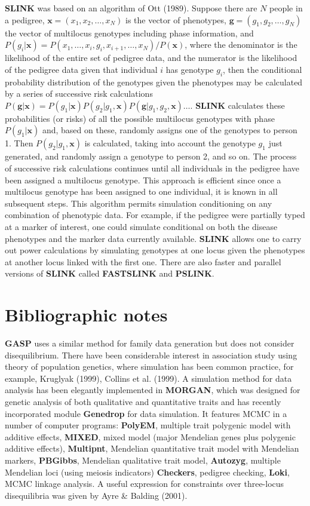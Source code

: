 {\bf SLINK} was based on an algorithm of Ott (1989).  Suppose there are $N$
people in a pedigree, $\mathbf{x} = (x_1, x_2,\ldots,x_N)$ is the vector of
phenotypes, $\mathbf{g} = (g_1, g_2,\ldots, g_N)$ the vector of multilocus
genotypes including phase information, and $P(g_i|\mathbf{x}) = {P(x_1, \ldots,
x_i, g_i, x_{i+1}, \ldots, x_N)}/{P(\mathbf{x})}$, where the denominator is the
likelihood of the entire set of pedigree data, and the numerator is the
likelihood of the pedigree data given that individual $i$ has genotype $g_i$,
then the conditional probability distribution of the genotypes given the
phenotypes may be calculated by a series of successive risk calculations
$P(\mathbf{g}|\mathbf{x}) = P(g_1|\mathbf{x}) P(g_2|g_1,\mathbf{x})
P(\mathbf{g}|g_1, g_2, \mathbf{x})\ldots$.  {\bf SLINK} calculates these
probabilities (or risks) of all the possible multilocus genotypes with phase
$P(g_1|\mathbf{x})$ and, based on these, randomly assigns one of the genotypes
to person 1.  Then $P(g_2|g_1, \mathbf{x})$ is calculated, taking into account
the genotype $g_1$ just generated, and randomly assign a genotype to person 2,
and so on.  The process of successive risk calculations continues until all
individuals in the pedigree have been assigned a multilocus genotype.  This
approach is efficient since once a multilocus genotype has been assigned to one
individual, it is known in all subsequent steps.  This algorithm permits
simulation conditioning on any combination of phenotypic data.  For example, if
the pedigree were partially typed at a marker of interest, one could simulate
conditional on both the disease phenotypes and the marker data currently
available.  {\bf SLINK} allows one to carry out power calculations by
simulating genotypes at one locus given the phenotypes at another locus linked
with the first one.  There are also faster and parallel versions of {\bf SLINK}
called {\bf FASTSLINK} and {\bf PSLINK}.


\section{Bibliographic notes}

{\bf GASP} uses a similar method for family data generation but does not
consider disequilibrium.  There have been considerable interest in association
study using theory of population genetics, where simulation has been common
practice, for example, Kruglyak (1999), Collins et al.  (1999). A simulation
method for data analysis has been elegantly implemented in {\bf MORGAN}, which
was designed for genetic analysis of both qualitative and quantitative traits
and has recently incorporated module {\bf Genedrop} for data simulation.  It
features MCMC in a number of computer programs:  {\bf PolyEM}, multiple trait
polygenic model with additive effects, {\bf MIXED}, mixed model (major
Mendelian genes plus polygenic additive effects), {\bf Multipnt}, Mendelian
quantitative trait model with Mendelian markers, {\bf PBGibbs}, Mendelian
qualitative trait model, {\bf Autozyg}, multiple Mendelian loci (using meiosis
indicators) {\bf Checkers}, pedigree checking, {\bf Loki}, MCMC linkage
analysis.  A useful expression for constraints over three-locus disequilibria
was given by Ayre \& Balding (2001).

